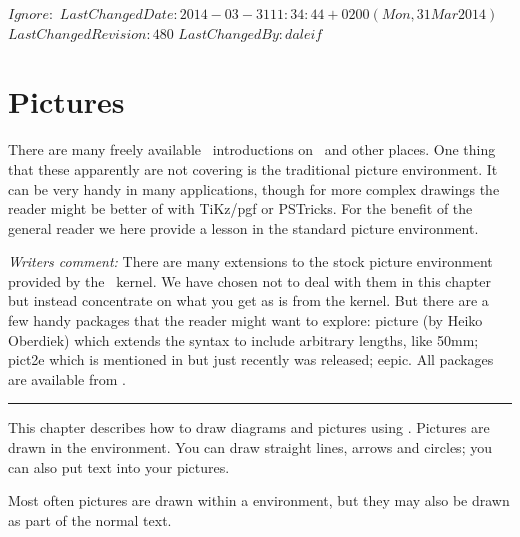 
\svnidlong
{$Ignore: $}
{$LastChangedDate: 2014-03-31 11:34:44 +0200 (Mon, 31 Mar 2014) $}
{$LastChangedRevision: 480 $}
{$LastChangedBy: daleif $}




\chapter{Pictures}  \label{chap:lpic}

There are many freely available \ltx\ introductions on \ctan\ and
other places. One thing that these apparently are not covering is the
traditional picture environment. It can be very handy in many
applications, though for more complex drawings the reader might be
better of with TiKz/pgf or PSTricks. For the benefit of the general
reader we here provide a lesson in the standard picture environment.

\emph{Writers comment:} There are many extensions to the stock picture
environment provided by the \ltx\ kernel. We have chosen not to deal
with them in this chapter but instead concentrate on what you get as
is from the kernel. But there are a few handy packages that the reader
might want to explore: picture (by Heiko Oberdiek) which extends the
 syntax to include arbitrary lengths, like 50mm; pict2e which
is mentioned in \cite{GCOMPANION} but just recently was released;
eepic. All packages are available from \ctan.



\fancybreak{}


    This chapter describes how to draw diagrams and 
pictures using \ltx.
Pictures are drawn in the  environment. You can draw 
straight
lines, arrows and circles; you can also put text into your pictures.

    Most often pictures are drawn within a  
environment, but
they may also be drawn as part of the normal text.




